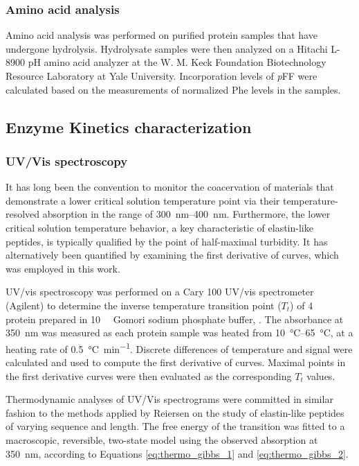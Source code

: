 \begin{refsection}
\subsubsection{Amino acid analysis}

Amino acid analysis was performed on purified protein samples that have
undergone hydrolysis. Hydrolysate samples were then analyzed on a Hitachi L-8900
pH amino acid analyzer at the W. M. Keck Foundation Biotechnology Resource
Laboratory at Yale University. Incorporation levels of \emph{p}FF were calculated based
on the measurements of normalized Phe levels in the samples.

\subsection{Enzyme Kinetics characterization}

\subsubsection{UV/Vis spectroscopy}
\label{sec:lcst_method}
It has long been the convention to monitor the coacervation of materials that
demonstrate a lower critical
solution temperature point via their temperature-resolved absorption in the
range of \SIrange{300}{400}{\nm}.\cite{Jamieson1972a} Furthermore, the lower critical solution
temperature behavior, a key characteristic of elastin-like peptides, is
typically qualified by the point of half-maximal turbidity.\cite{Urry1993} It
has alternatively been quantified by examining the first derivative of
curves,\cite{Furgeson2006,Liu2010b,Mackay2010a,Meyer2004} which was employed in
this work.

UV/vis spectroscopy was performed on a Cary 100 UV/vis spectrometer (Agilent) to
determine the inverse temperature transition point ({$T_t$}) of
\SI{4}{\micro\moLar} protein prepared in \SI{10}{\milli\moLar} Gomori sodium
phosphate buffer, . The absorbance at \SI{350}{\nm} was measured as each
protein sample was heated from \SIrange{10}{65}{\celsius}, at a heating rate of
\SI{0.5}{\celsius\per\minute}.\cite{Chilkoti2002a} Discrete differences of
temperature and signal were calculated and used to compute the first derivative
of curves. Maximal points in the first derivative curves were then evaluated as
the corresponding ${T_t}$ values.

\label{sec:thermo_method}
Thermodynamic analyses of UV/Vis spectrograms were committed in similar fashion
to the methods applied by Reiersen on the study of elastin-like peptides of
varying sequence and length.\cite{Reiersen1998} The free energy of the
transition was fitted to a macroscopic, reversible, two-state model using the
observed absorption at \SI{350}{\nm}, according to Equations
\ref{eq:thermo_gibbs_1} and \ref{eq:thermo_gibbs_2}.


\end{refsection}
